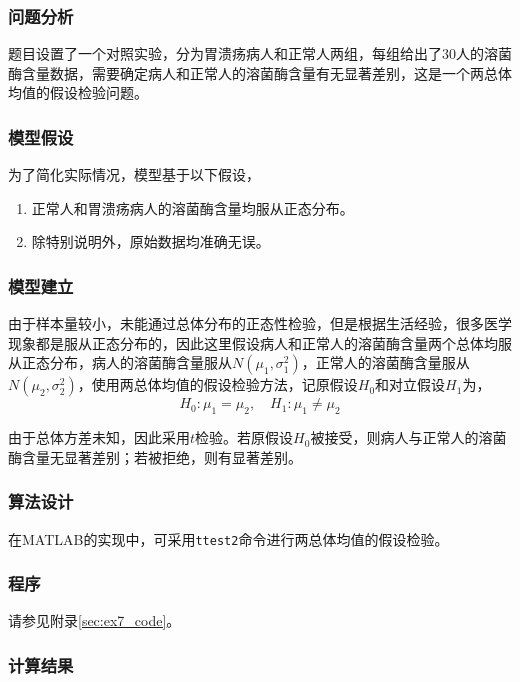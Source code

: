 \subsubsection{问题分析}

题目设置了一个对照实验，分为胃溃疡病人和正常人两组，每组给出了30人的溶菌酶含量数据，需要确定病人和正常人的溶菌酶含量有无显著差别，这是一个两总体均值的假设检验问题。

\subsubsection{模型假设}

为了简化实际情况，模型基于以下假设，
\begin{enumerate}
    \item 正常人和胃溃疡病人的溶菌酶含量均服从正态分布。
    \item 除特别说明外，原始数据均准确无误。
\end{enumerate}

\subsubsection{模型建立}

由于样本量较小，未能通过总体分布的正态性检验，但是根据生活经验，很多医学现象都是服从正态分布的，因此这里假设病人和正常人的溶菌酶含量两个总体均服从正态分布，病人的溶菌酶含量服从$N(\mu_1, \sigma_1^2)$，正常人的溶菌酶含量服从$N(\mu_2, \sigma_2^2)$，使用两总体均值的假设检验方法，记原假设$H_0$和对立假设$H_1$为，
\begin{equation}
    H_0: \mu_1 = \mu_2, \quad H_1: \mu_1 \ne \mu_2
\end{equation}

由于总体方差未知，因此采用$t$检验。若原假设$H_0$被接受，则病人与正常人的溶菌酶含量无显著差别；若被拒绝，则有显著差别。

\subsubsection{算法设计}

在MATLAB的实现中，可采用\texttt{ttest2}命令进行两总体均值的假设检验。

\subsubsection{程序}

请参见附录\ref{sec:ex7_code}。

\subsubsection{计算结果}

